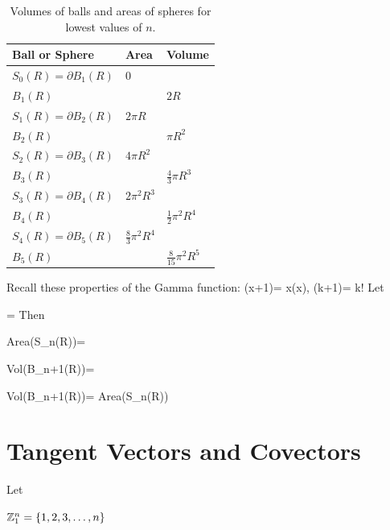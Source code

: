 \begin{table}[h!]
\centering
\begin{tabular}{|l|l|l|}
\hline
\rowcolor[HTML]{FFFC9E} 
Ball or Sphere & Area & Volume \\ \hline
\cellcolor[HTML]{FFFFFF}$S_0(R)=\partial B_1(R)$ & \cellcolor[HTML]{FFFFFF}0 &  \\ \hline
\cellcolor[HTML]{FFFFFF}$B_1(R)$ & \cellcolor[HTML]{FFFFFF} & $2R$ \\ \hline
$S_1(R)=\partial B_2(R)$ & \cellcolor[HTML]{FFFFFF}$2\pi R$ &  \\ \hline
$B_2(R)$ & \cellcolor[HTML]{FFFFFF} & $\pi R^2$ \\ \hline
$S_2(R)=\partial B_3(R)$ & $4\pi R^2$ &  \\ \hline
$B_3(R)$ &  & $\frac{4}{3}\pi R^3$ \\ \hline
$S_3(R)=\partial B_4(R)$ & $2\pi^2 R^3$ &  \\ \hline
$B_4(R)$ &  & $\frac{1}{2}\pi^2 R^4$ \\ \hline
$S_4(R)=\partial B_5(R)$ & $\frac{8}{3} \pi^2 R^4$ &  \\ \hline
$B_5(R)$ &  & $\frac{8}{15}\pi^2 R^5$ \\ \hline
\end{tabular}
\caption{Volumes of balls and areas of spheres for lowest values of $n$.}
\label{tab-ball-sphere-area-vol}
\end{table}

Recall these properties of the Gamma function:
\beq
\Gamma(x+1)= x\Gamma(x),
\quad
\Gamma(k+1)= k!
\eeq
Let

\beq
\nu=
\eeq
Then


\beq
Area(S_n(R))=
\eeq

\beq
Vol(B_{n+1}(R))= 
\eeq

\beq
{}Vol(B_{n+1}(R))=
Area(S_n(R))
\eeq




\section{Tangent Vectors and Covectors}

Let

${\mathbb{Z}}_1^n = \{1, 2, 3, \ldots, n\}$

